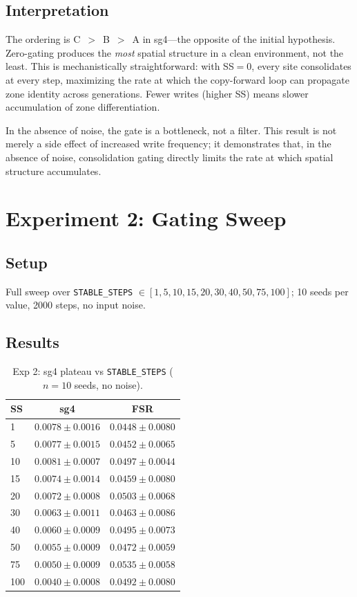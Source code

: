 \documentclass[11pt,twocolumn]{article}
\begin{document}
\subsection{Interpretation}

The ordering is C~$>$~B~$>$~A in sg4---the opposite of the initial hypothesis.
Zero-gating produces the \emph{most} spatial structure in a clean environment,
not the least. This is mechanistically straightforward: with SS$=0$, every site
consolidates at every step, maximizing the rate at which the copy-forward loop
can propagate zone identity across generations. Fewer writes (higher SS) means
slower accumulation of zone differentiation.

In the absence of noise, the gate is a bottleneck, not a filter.
This result is not merely a side effect of increased write frequency;
it demonstrates that, in the absence of noise, consolidation gating
directly limits the rate at which spatial structure accumulates.

\section{Experiment 2: Gating Sweep}

\subsection{Setup}

Full sweep over \texttt{STABLE\_STEPS} $\in [1, 5, 10, 15, 20, 30, 40, 50, 75, 100]$;
10 seeds per value, 2000 steps, no input noise.

\subsection{Results}

\begin{table}[h]
\centering
\caption{Exp 2: sg4 plateau vs \texttt{STABLE\_STEPS} ($n=10$ seeds, no noise).}
\label{tab:exp2}
\begin{tabular}{lcc}
\toprule
SS & sg4 & FSR \\
\midrule
1   & $0.0078 \pm 0.0016$ & $0.0448 \pm 0.0080$ \\
5   & $0.0077 \pm 0.0015$ & $0.0452 \pm 0.0065$ \\
10  & $0.0081 \pm 0.0007$ & $0.0497 \pm 0.0044$ \\
15  & $0.0074 \pm 0.0014$ & $0.0459 \pm 0.0080$ \\
20  & $0.0072 \pm 0.0008$ & $0.0503 \pm 0.0068$ \\
30  & $0.0063 \pm 0.0011$ & $0.0463 \pm 0.0086$ \\
40  & $0.0060 \pm 0.0009$ & $0.0495 \pm 0.0073$ \\
50  & $0.0055 \pm 0.0009$ & $0.0472 \pm 0.0059$ \\
75  & $0.0050 \pm 0.0009$ & $0.0535 \pm 0.0058$ \\
100 & $0.0040 \pm 0.0008$ & $0.0492 \pm 0.0080$ \\
\bottomrule
\end{tabular}
\end{table}
\end{document}
